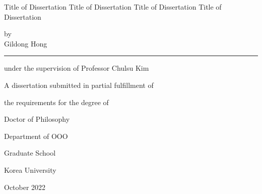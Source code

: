 \documentclass{report}
\begin{document}
\newpage %
\begin{center}
\huge Title of Dissertation Title of Dissertation Title of Dissertation Title of Dissertation  
\par\vspace{1.5cm} %
\Large by\\
Gildong Hong %
\par\vspace{1.0cm}
\rule{.6\textwidth}{0.4pt} %
\par\vspace{0.7cm}
under the supervision of Professor Chulsu Kim
\par\vspace{0.7cm}
A dissertation submitted in partial fulfillment of \par
the requirements for the degree of \par
Doctor of Philosophy  
\par\vspace{10pt}
\Large Department of OOO %
\par\vspace{1.5cm}
\LARGE Graduate School 
\par\vspace{0.2cm}
\LARGE Korea University 
\par\vspace{1cm}
\large October 2022 %
\end{center}


\end{document}
